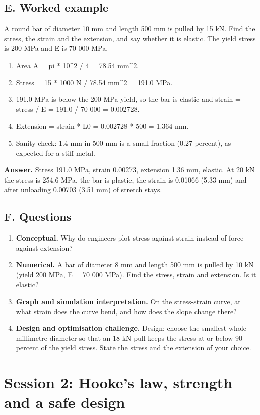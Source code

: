 \documentclass[11pt,a4paper]{article}
\begin{document}
\subsection*{E. Worked example}
A round bar of diameter 10 mm and length 500 mm is pulled by 15 kN. Find the stress, the strain and the extension, and say whether it is elastic. The yield stress is 200 MPa and E is 70 000 MPa.
\begin{enumerate}[nosep]
\item Area A = pi * 10\textasciicircum{}2 / 4 = 78.54 mm\textasciicircum{}2.
\item Stress = 15 * 1000 N / 78.54 mm\textasciicircum{}2 = 191.0 MPa.
\item 191.0 MPa is below the 200 MPa yield, so the bar is elastic and strain = stress / E = 191.0 / 70 000 = 0.002728.
\item Extension = strain * L0 = 0.002728 * 500 = 1.364 mm.
\item Sanity check: 1.4 mm in 500 mm is a small fraction (0.27 percent), as expected for a stiff metal.
\end{enumerate}
\textbf{Answer.} Stress 191.0 MPa, strain 0.00273, extension 1.36 mm, elastic. At 20 kN the stress is 254.6 MPa, the bar is plastic, the strain is 0.01066 (5.33 mm) and after unloading 0.00703 (3.51 mm) of stretch stays.

\subsection*{F. Questions}
\begin{enumerate}[nosep]
\item \textbf{Conceptual.} Why do engineers plot stress against strain instead of force against extension?
\item \textbf{Numerical.} A bar of diameter 8 mm and length 500 mm is pulled by 10 kN (yield 200 MPa, E = 70 000 MPa). Find the stress, strain and extension. Is it elastic?
\item \textbf{Graph and simulation interpretation.} On the stress-strain curve, at what strain does the curve bend, and how does the slope change there?
\item \textbf{Design and optimisation challenge.} Design: choose the smallest whole-millimetre diameter so that an 18 kN pull keeps the stress at or below 90 percent of the yield stress. State the stress and the extension of your choice.
\end{enumerate}

\section{Session 2: Hooke's law, strength and a safe design}
\end{document}
